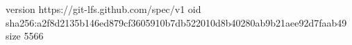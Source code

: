version https://git-lfs.github.com/spec/v1
oid sha256:a2f8d2135b146ed879cf3605910b7db522010d8b40280ab9b21aee92d7faab49
size 5566
